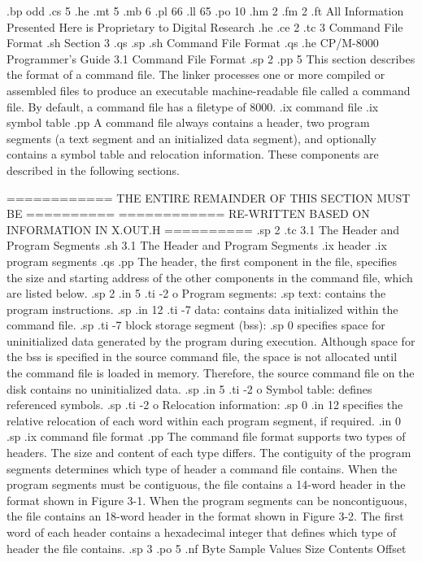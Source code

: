 .bp odd
.cs 5
.he
.mt 5
.mb 6
.pl 66
.ll 65
.po 10
.hm 2
.fm 2
.ft All Information Presented Here is Proprietary to Digital Research
.he
.ce 2
.tc 3  Command File Format 
.sh
Section 3
.qs
.sp
.sh
Command File Format
.qs
.he CP/M-8000 Programmer's Guide              3.1  Command File Format
.sp 2
.pp 5
This section describes the format of a command file.  
The linker processes one or more compiled or assembled files to
produce an executable machine-readable file called a command
file.  By default, a command file has a filetype of 8000. 
.ix command file
.ix symbol table
.pp
A command file always contains a header, two program segments
(a text segment and an initialized data segment), and optionally
contains a symbol table and relocation information.  These components are 
described in the following sections. 

============ THE ENTIRE REMAINDER OF THIS SECTION MUST BE ==========
============ RE-WRITTEN BASED ON INFORMATION IN X.OUT.H   ==========
.sp 2
.tc    3.1  The Header and Program Segments
.sh
3.1  The Header and Program Segments
.ix header
.ix program segments
.qs
.pp
The header, the first component in the file, specifies
the size and starting address of the other components in the command 
file, which are listed below.
.sp 2
.in 5
.ti -2
o Program segments:
.sp
text:  contains the program instructions.
.sp
.in 12
.ti -7
data:  contains data initialized within the command file.
.sp
.ti -7
block storage segment (bss): 
.sp 0 
specifies space for uninitialized data generated by the program during
execution.  Although space for the bss is specified in the source command
file, the space is not allocated until the command file is loaded in memory.
Therefore, the source command file on the disk contains no uninitialized data. 
.sp
.in 5
.ti -2
o Symbol table: defines referenced symbols.
.sp
.ti -2
o Relocation information:
.sp 0
.in 12
specifies the relative relocation of 
each word within each program segment, if required. 
.in 0
.sp
.ix command file format
.pp
The command file format supports two types of headers.  The size
and content of each type differs.  The contiguity of the  program
segments determines which type of header a command file contains.
When the program segments must be contiguous, the file contains a
14-word header in the format shown in Figure 3-1.  When the
program segments can be noncontiguous, the file contains an
18-word header in the format shown in Figure 3-2.  The first word
of each header contains a hexadecimal integer that defines which
type of header the file contains. 
.sp 3
.po 5
.nf
Byte      Sample Values          Size            Contents 
Offset 
                                    

